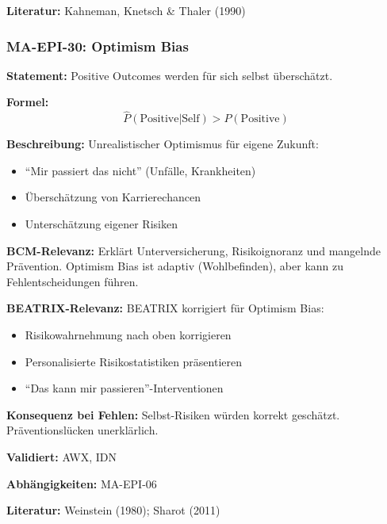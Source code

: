 \textbf{Literatur:} Kahneman, Knetsch \& Thaler (1990)


\subsubsection*{MA-EPI-30: Optimism Bias}

\textbf{Statement:} Positive Outcomes werden für sich selbst überschätzt.

\textbf{Formel:}
\begin{equation}
\hat{P}(\text{Positive}|\text{Self}) > P(\text{Positive})
\end{equation}

\textbf{Beschreibung:}
Unrealistischer Optimismus für eigene Zukunft:
\begin{itemize}
    \item ``Mir passiert das nicht'' (Unfälle, Krankheiten)
    \item Überschätzung von Karrierechancen
    \item Unterschätzung eigener Risiken
\end{itemize}

\textbf{BCM-Relevanz:}
Erklärt Unterversicherung, Risikoignoranz und mangelnde Prävention. Optimism Bias ist adaptiv (Wohlbefinden), aber kann zu Fehlentscheidungen führen.

\textbf{BEATRIX-Relevanz:}
BEATRIX korrigiert für Optimism Bias:
\begin{itemize}
    \item Risikowahrnehmung nach oben korrigieren
    \item Personalisierte Risikostatistiken präsentieren
    \item ``Das kann mir passieren''-Interventionen
\end{itemize}

\textbf{Konsequenz bei Fehlen:}
Selbst-Risiken würden korrekt geschätzt. Präventionslücken unerklärlich.

\textbf{Validiert:} AWX, IDN

\textbf{Abhängigkeiten:} MA-EPI-06

\textbf{Literatur:} Weinstein (1980); Sharot (2011)


